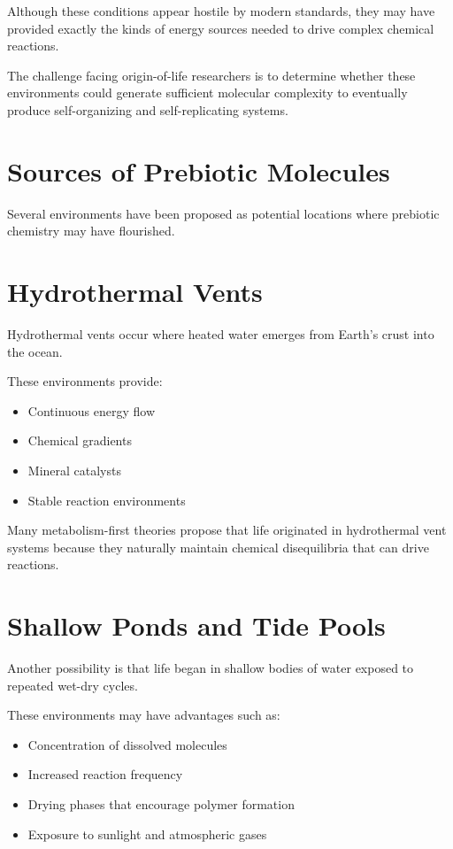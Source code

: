 \documentclass[
  oneside,
  openany]{book}
\providecommand{\tightlist}{%
  \setlength{\itemsep}{0pt}\setlength{\parskip}{0pt}}
\begin{document}
Although these conditions appear hostile by modern standards, they may have provided exactly the kinds of energy sources needed to drive complex chemical reactions.

The challenge facing origin-of-life researchers is to determine whether these environments could generate sufficient molecular complexity to eventually produce self-organizing and self-replicating systems.

\section{Sources of Prebiotic Molecules}\label{sources-of-prebiotic-molecules}

Several environments have been proposed as potential locations where prebiotic chemistry may have flourished.

\section{Hydrothermal Vents}\label{hydrothermal-vents}

Hydrothermal vents occur where heated water emerges from Earth's crust into the ocean.

These environments provide:

\begin{itemize}
\tightlist
\item
  Continuous energy flow
\item
  Chemical gradients
\item
  Mineral catalysts
\item
  Stable reaction environments
\end{itemize}

Many metabolism-first theories propose that life originated in hydrothermal vent systems because they naturally maintain chemical disequilibria that can drive reactions.

\section{Shallow Ponds and Tide Pools}\label{shallow-ponds-and-tide-pools}

Another possibility is that life began in shallow bodies of water exposed to repeated wet-dry cycles.

These environments may have advantages such as:

\begin{itemize}
\tightlist
\item
  Concentration of dissolved molecules
\item
  Increased reaction frequency
\item
  Drying phases that encourage polymer formation
\item
  Exposure to sunlight and atmospheric gases
\end{itemize}
\end{document}
